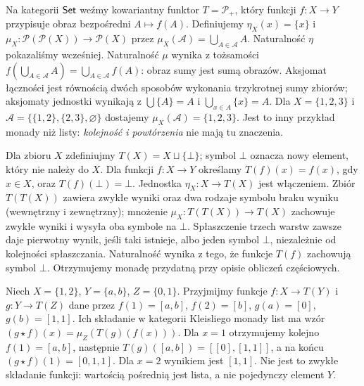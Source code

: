 \begin{przyklad}\label{przyklad:powerset-monad}
Na kategorii $\mathsf{Set}$ weźmy kowariantny funktor $T=\mathcal P_+$, który funkcji $f:X\to Y$ przypisuje obraz bezpośredni $A\mapsto f(A)$. Definiujemy $\eta_X(x)=\{x\}$ i $\mu_X:\mathcal P(\mathcal P(X))\to\mathcal P(X)$ przez $\mu_X(\mathscr A)=\bigcup_{A\in\mathscr A}A$. Naturalność $\eta$ pokazaliśmy wcześniej. Naturalność $\mu$ wynika z tożsamości $f(\bigcup_{A\in\mathscr A}A)=\bigcup_{A\in\mathscr A}f(A)$: obraz sumy jest sumą obrazów. Aksjomat łączności jest równością dwóch sposobów wykonania trzykrotnej sumy zbiorów; aksjomaty jednostki wynikają z $\bigcup\{A\}=A$ i $\bigcup_{x\in A}\{x\}=A$. Dla $X=\{1,2,3\}$ i $\mathscr A=\{\{1,2\},\{2,3\},\varnothing\}$ dostajemy $\mu_X(\mathscr A)=\{1,2,3\}$. Jest to inny przykład monady niż listy: \emph{kolejność i powtórzenia} nie mają tu znaczenia.
\end{przyklad}

\begin{przyklad}
Dla zbioru $X$ zdefiniujmy $T(X)=X\sqcup\{\bot\}$; symbol $\bot$ oznacza nowy element, który nie należy do $X$. Dla funkcji $f:X\to Y$ określamy $T(f)(x)=f(x)$, gdy $x\in X$, oraz $T(f)(\bot)=\bot$. Jednostka $\eta_X:X\to T(X)$ jest włączeniem. Zbiór $T(T(X))$ zawiera zwykłe wyniki oraz dwa rodzaje symbolu braku wyniku (wewnętrzny i zewnętrzny); mnożenie $\mu_X:T(T(X))\to T(X)$ zachowuje zwykłe wyniki i wysyła oba symbole na $\bot$. Spłaszczenie trzech warstw zawsze daje pierwotny wynik, jeśli taki istnieje, albo jeden symbol $\bot$, niezależnie od kolejności spłaszczania. Naturalność wynika z tego, że funkcje $T(f)$ zachowują symbol $\bot$. Otrzymujemy monadę przydatną przy opisie obliczeń częściowych.
\end{przyklad}

\begin{przyklad}
Niech $X=\{1,2\}$, $Y=\{a,b\}$, $Z=\{0,1\}$. Przyjmijmy funkcje $f:X\to T(Y)$ i $g:Y\to T(Z)$ dane przez
$f(1)=[a,b]$, $f(2)=[b]$, $g(a)=[0]$, $g(b)=[1,1]$.
Ich składanie w kategorii Kleisliego monady list ma wzór $(g\star f)(x)=\mu_Z(T(g)(f(x)))$. Dla $x=1$ otrzymujemy kolejno $f(1)=[a,b]$, następnie $T(g)([a,b])=[[0],[1,1]]$, a na końcu $(g\star f)(1)=[0,1,1]$. Dla $x=2$ wynikiem jest $[1,1]$. Nie jest to zwykłe składanie funkcji: wartością pośrednią jest lista, a nie pojedynczy element $Y$.
\end{przyklad}


